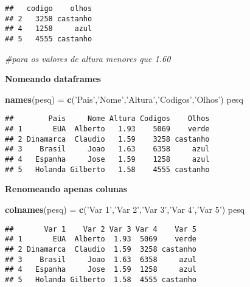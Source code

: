 \documentclass[]{article}
\newenvironment{Shaded}{\begin{snugshade}}{\end{snugshade}}
\newcommand{\KeywordTok}[1]{\textcolor[rgb]{0.13,0.29,0.53}{\textbf{#1}}}
\newcommand{\StringTok}[1]{\textcolor[rgb]{0.31,0.60,0.02}{#1}}
\newcommand{\CommentTok}[1]{\textcolor[rgb]{0.56,0.35,0.01}{\textit{#1}}}
\newcommand{\NormalTok}[1]{#1}
\begin{document}
\begin{verbatim}
##   codigo    olhos
## 2   3258 castanho
## 4   1258     azul
## 5   4555 castanho
\end{verbatim}

\begin{Shaded}
\begin{Highlighting}[]
\CommentTok{#para os valores de altura menores que 1.60}
\end{Highlighting}
\end{Shaded}

\textbf{Nomeando dataframes}

\begin{Shaded}
\begin{Highlighting}[]
\KeywordTok{names}\NormalTok{(pesq) =}\StringTok{ }\KeywordTok{c}\NormalTok{(}\StringTok{'Pais'}\NormalTok{,}\StringTok{'Nome'}\NormalTok{,}\StringTok{'Altura'}\NormalTok{,}\StringTok{'Codigos'}\NormalTok{,}\StringTok{'Olhos'}\NormalTok{)}
\NormalTok{pesq}
\end{Highlighting}
\end{Shaded}

\begin{verbatim}
##        Pais     Nome Altura Codigos    Olhos
## 1       EUA  Alberto   1.93    5069    verde
## 2 Dinamarca  Claudio   1.59    3258 castanho
## 3    Brasil     Joao   1.63    6358     azul
## 4   Espanha     Jose   1.59    1258     azul
## 5   Holanda Gilberto   1.58    4555 castanho
\end{verbatim}

\textbf{Renomeando apenas colunas}

\begin{Shaded}
\begin{Highlighting}[]
\KeywordTok{colnames}\NormalTok{(pesq) =}\StringTok{ }\KeywordTok{c}\NormalTok{(}\StringTok{'Var 1'}\NormalTok{,}\StringTok{'Var 2'}\NormalTok{,}\StringTok{'Var 3'}\NormalTok{,}\StringTok{'Var 4'}\NormalTok{,}\StringTok{'Var 5'}\NormalTok{) }
\NormalTok{pesq}
\end{Highlighting}
\end{Shaded}

\begin{verbatim}
##       Var 1    Var 2 Var 3 Var 4    Var 5
## 1       EUA  Alberto  1.93  5069    verde
## 2 Dinamarca  Claudio  1.59  3258 castanho
## 3    Brasil     Joao  1.63  6358     azul
## 4   Espanha     Jose  1.59  1258     azul
## 5   Holanda Gilberto  1.58  4555 castanho
\end{verbatim}
\end{document}
